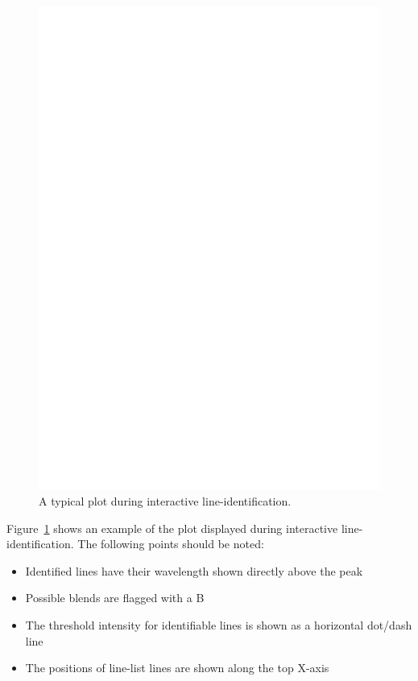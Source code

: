 \documentclass[twoside,11pt]{article}
\renewcommand{\_}{\texttt{\symbol{95}}}
\newcommand{\sunspec}[2]{#1}
\newcommand{\sunspec}[2]{#2}
\begin{document}
\begin{figure}
\begin{center}
\includegraphics[width=\textwidth]{sun152_06.eps}

\parbox{140mm}{
\caption{A typical plot during interactive line-identification.}
\label{fi_idline}
}
\end{center}
\end{figure}

\sunspec{Figure~\ref{fi_idline}}{The Figure above}
shows an example of the plot displayed during interactive line-identification.
The following points should be noted:

\begin{itemize}
\item Identified lines have their wavelength shown directly above the peak
\item Possible blends are flagged with a B
\item The threshold intensity for identifiable lines is shown as a horizontal
dot/dash line
\item The positions of line-list lines are shown along the top X-axis
\end{itemize}
\end{document}
